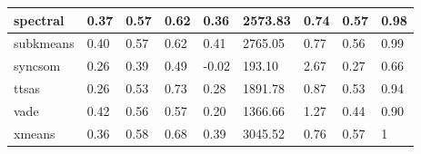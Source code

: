 \begin{table}[H]
\begin{tabular}{|l|l|l|l|l|l|l|l|l|}
\hline
spectral & 0.37 & 0.57 & 0.62 & 0.36 & 2573.83 & 0.74 & 0.57 & 0.98 \\
\hline
subkmeans & 0.40 & 0.57 & 0.62 & 0.41 & 2765.05 & 0.77 & 0.56 & 0.99 \\
\hline
syncsom & 0.26 & 0.39 & 0.49 & -0.02 & 193.10 & 2.67 & 0.27 & 0.66 \\
\hline
ttsas & 0.26 & 0.53 & 0.73 & 0.28 & 1891.78 & 0.87 & 0.53 & 0.94 \\
\hline
vade & 0.42 & 0.56 & 0.57 & 0.20 & 1366.66 & 1.27 & 0.44 & 0.90 \\
\hline
xmeans & 0.36 & 0.58 & 0.68 & 0.39 & 3045.52 & 0.76 & 0.57 & 1 \\
\hline
\end{tabular}
\end{table}



